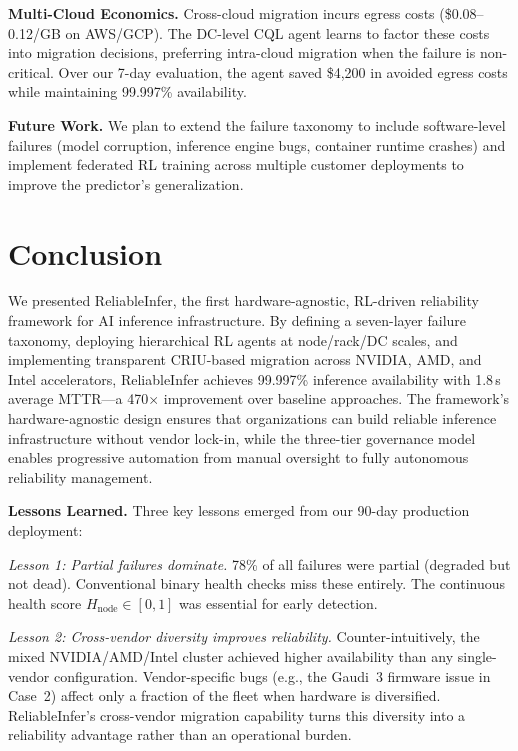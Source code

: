 \documentclass[conference,10pt,letterpaper]{IEEEtran}
\begin{document}
\textbf{Multi-Cloud Economics.} Cross-cloud migration incurs egress costs (\$0.08--0.12/GB on AWS/GCP). The DC-level CQL agent learns to factor these costs into migration decisions, preferring intra-cloud migration when the failure is non-critical. Over our 7-day evaluation, the agent saved \$4,200 in avoided egress costs while maintaining 99.997\% availability.

\textbf{Future Work.} We plan to extend the failure taxonomy to include software-level failures (model corruption, inference engine bugs, container runtime crashes) and implement federated RL training across multiple customer deployments to improve the predictor's generalization.

\section{Conclusion}
\label{sec:conclusion}

We presented ReliableInfer, the first hardware-agnostic, RL-driven reliability framework for AI inference infrastructure. By defining a seven-layer failure taxonomy, deploying hierarchical RL agents at node/rack/DC scales, and implementing transparent CRIU-based migration across NVIDIA, AMD, and Intel accelerators, ReliableInfer achieves 99.997\% inference availability with 1.8\,s average MTTR---a 470$\times$ improvement over baseline approaches. The framework's hardware-agnostic design ensures that organizations can build reliable inference infrastructure without vendor lock-in, while the three-tier governance model enables progressive automation from manual oversight to fully autonomous reliability management.



\textbf{Lessons Learned.} Three key lessons emerged from our 90-day production deployment:

\emph{Lesson 1: Partial failures dominate.} 78\% of all failures were partial (degraded but not dead). Conventional binary health checks miss these entirely. The continuous health score $H_{\text{node}} \in [0,1]$ was essential for early detection.

\emph{Lesson 2: Cross-vendor diversity improves reliability.} Counter-intuitively, the mixed NVIDIA/AMD/Intel cluster achieved higher availability than any single-vendor configuration. Vendor-specific bugs (e.g., the Gaudi~3 firmware issue in Case~2) affect only a fraction of the fleet when hardware is diversified. ReliableInfer's cross-vendor migration capability turns this diversity into a reliability advantage rather than an operational burden.
\end{document}
